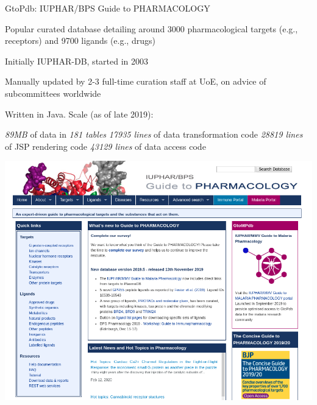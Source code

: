 \documentclass[11.5pt, aspectratio=169]{beamer}
\begin{document}
\begin{frame}{GtoPdb: IUPHAR/BPS Guide to PHARMACOLOGY}
  \begin{minipage}{0.525\textwidth}
    \begin{fullpageitemize}
    \item Popular curated database detailing around 3000 pharmacological targets (e.g.,
      receptors) and 9700 ligands (e.g., drugs)
      \vspace{1em}
    \item Initially IUPHAR-DB, started in 2003
      \vspace{1em}
    \item Manually updated by 2-3 full-time curation staff at
      UoE, on advice of subcommittees worldwide
      \vspace{1em}
    \item Written in Java. Scale (as of late 2019):
      \begin{itemize}
        \itemR \emph{89MB} of data in \emph{181 tables}
        \itemR \emph{17935 lines} of data transformation code
        \itemR \emph{28819 lines} of JSP rendering code
        \itemR \emph{43129 lines} of data access code
      \end{itemize}
    \end{fullpageitemize}
  \end{minipage}
  \hfill
  \begin{minipage}{0.4\textwidth}
    \includegraphics[width=\textwidth]{images/gtopdb-screenshot.png}
  \end{minipage}
\end{frame}
\end{document}
